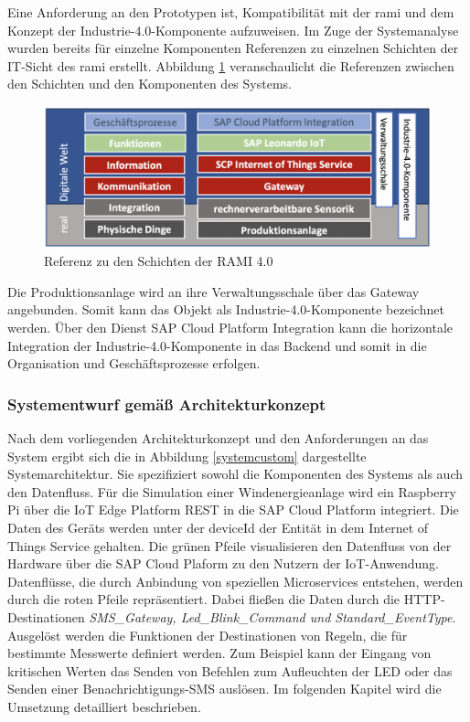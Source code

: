 Eine Anforderung an den Prototypen ist,  Kompatibilität mit der \ac{rami} und dem Konzept der Industrie-4.0-Komponente aufzuweisen. Im Zuge der Systemanalyse wurden bereits für einzelne Komponenten Referenzen zu einzelnen Schichten der IT-Sicht des \ac{rami} erstellt. Abbildung \ref{ramicustom} veranschaulicht die Referenzen zwischen den Schichten und den Komponenten des Systems.

\begin{figure}[H]
  \centering
  \includegraphics[width=1.0\linewidth]{pictures/ramicustom}
  \caption[Referenz zu den Schichten der RAMI 4.0]{Referenz zu den Schichten der RAMI 4.0}
  \label{ramicustom}
\end{figure}
 \noindent Die Produktionsanlage wird an ihre Verwaltungsschale über das Gateway angebunden. Somit kann das Objekt als Industrie-4.0-Komponente bezeichnet werden. Über den Dienst SAP Cloud Platform Integration kann die horizontale Integration der Industrie-4.0-Komponente in das Backend und somit in die Organisation und Geschäftsprozesse erfolgen.

\subsubsection{Systementwurf gemäß Architekturkonzept} \label{systementwurf}

Nach dem vorliegenden Architekturkonzept und den Anforderungen an das System ergibt sich die in Abbildung \ref{systemcustom} dargestellte Systemarchitektur. Sie spezifiziert sowohl die Komponenten des Systems als auch den Datenfluss. Für die Simulation einer Windenergieanlage wird ein Raspberry Pi über die IoT Edge Platform REST in die SAP Cloud Platform integriert. Die Daten des Geräts werden unter der deviceId der Entität in dem Internet of Things Service gehalten. Die grünen Pfeile visualisieren den Datenfluss von der Hardware über die SAP Cloud Plaform zu den Nutzern der IoT-Anwendung. Datenflüsse, die durch Anbindung von speziellen Microservices entstehen, werden durch die roten Pfeile repräsentiert. Dabei fließen die Daten durch die HTTP-Destinationen \textit{SMS\_Gateway, Led\_Blink\_Command und Standard\_EventType}. Ausgelöst werden die Funktionen der Destinationen von Regeln, die für bestimmte Messwerte definiert werden. Zum Beispiel kann der Eingang von kritischen Werten das Senden von Befehlen zum Aufleuchten der LED oder das Senden einer Benachrichtigungs-SMS auslösen. Im folgenden Kapitel wird die Umsetzung detailliert beschrieben.

